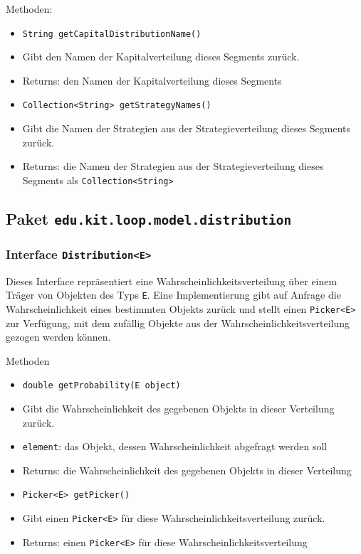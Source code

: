 \documentclass[parskip=full,11pt]{scrartcl}
\begin{document}
Methoden:
\begin{itemize}\itemsep -10pt
\item \texttt{String getCapitalDistributionName()}
\item[] Gibt den Namen der Kapitalverteilung dieses Segments zurück.
\item[] Returns: den Namen der Kapitalverteilung dieses Segments

\item \texttt{Collection<String> getStrategyNames()}
\item[] Gibt die Namen der Strategien aus der Strategieverteilung dieses Segments zurück.
\item[] Returns: die Namen der Strategien aus der Strategieverteilung dieses Segments als \texttt{Collection<String>}
\end{itemize}

\subsection{Paket \texttt{edu.kit.loop.model.distribution}}

\subsubsection{Interface \texttt{Distribution<E>}}
Dieses Interface repräsentiert eine Wahrscheinlichkeitsverteilung über einem Träger von Objekten des Typs \texttt{E}. Eine Implementierung gibt auf Anfrage die Wahrscheinlichkeit eines bestimmten Objekts zurück und stellt einen \texttt{Picker<E>} zur Verfügung, mit dem zufällig Objekte aus der Wahrscheinlichkeitsverteilung gezogen werden können.

Methoden
\begin{itemize}\itemsep -10pt
\item \texttt{double getProbability(E object)}
\item[] Gibt die Wahrscheinlichkeit des gegebenen Objekts in dieser Verteilung zurück.
\item[] \texttt{element}: das Objekt, dessen Wahrscheinlichkeit abgefragt werden soll
\item[] Returns: die Wahrscheinlichkeit des gegebenen Objekts in dieser Verteilung

\item \texttt{Picker<E> getPicker()}
\item[] Gibt einen \texttt{Picker<E>} für diese Wahrscheinlichkeitsverteilung zurück.
\item[] Returns: einen \texttt{Picker<E>} für diese Wahrscheinlichkeitsverteilung
\end{itemize}
\end{document}
